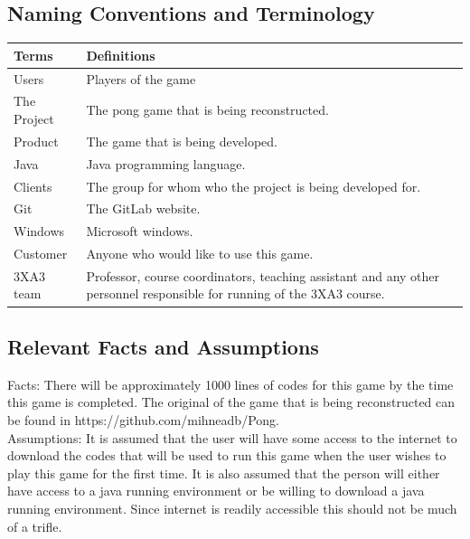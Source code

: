 \documentclass[12pt,letterpaper]{article}
\begin{document}
\subsection{Naming Conventions and Terminology}
\begin{tabular}{|p{3cm}|p{8cm}|}
\hline
\textbf{Terms}    & \textbf{Definitions}                                                                                                                                                                                                                                                                                                                                                                                                                                \\\hline
Users &                                                                                                                                                                                            Players of the game \\\hline
The Project  & The pong game that is being reconstructed. \\\hline
Product       & The game that is being developed.
 \\\hline
Java            & Java programming language.
 \\\hline
Clients          & 	The group for whom who the project is being developed for.
 \\\hline
Git        & The GitLab website.
 \\\hline
Windows       & Microsoft windows.
 \\\hline
Customer         & Anyone who would like to use this game.
 \\\hline
3XA3 team        & Professor, course coordinators, teaching assistant and any other personnel responsible for running of the 3XA3 course.
 \\\hline
\end{tabular}


	\subsection{Relevant Facts and Assumptions}
Facts:
There will be approximately 1000 lines of codes for this game by the time this game is completed. The original of the game that is being reconstructed can be found in https://github.com/mihneadb/Pong.\\  


\noindent Assumptions:
It is assumed that the user will have some access to the internet to download the codes that will be used to run this game when the user wishes to play this game for the first time. It is also assumed that the person will either have access to a java running environment or be willing to download a java running environment. Since internet is readily accessible this should not be much of a trifle.
\end{document}
